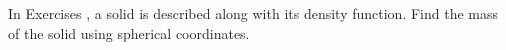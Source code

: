 {\noindent In Exercises} 
{,  a solid is described along with its density function. Find the  mass of the solid using  spherical coordinates. %
}
